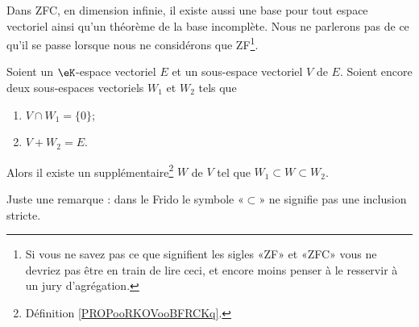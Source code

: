 Dans ZFC, en dimension infinie, il existe aussi une base pour tout espace vectoriel ainsi qu'un théorème de la base incomplète. Nous ne parlerons pas de ce qu'il se passe lorsque nous ne considérons que ZF\footnote{Si vous ne savez pas ce que signifient les sigles «ZF» et «ZFC» vous ne devriez pas être en train de lire ceci, et encore moins penser à le resservir à un jury d'agrégation.}.

\begin{lemma}        \label{LEMooSSRXooIyfgNz}
	Soient un \( \eK\)-espace vectoriel \( E\) et un sous-espace vectoriel \( V\) de \( E\). Soient encore deux sous-espaces vectoriels \( W_1\) et \( W_2\) tels que
	\begin{enumerate}
		\item
		      \( V\cap W_1=\{ 0 \}\);
		\item
		      \( V+W_2=E\).
	\end{enumerate}
	Alors il existe un supplémentaire\footnote{Définition \ref{PROPooRKOVooBFRCKq}.} \( W\) de \( V\) tel que \( W_1\subset W\subset W_2\).
\end{lemma}

Juste une remarque : dans le Frido le symbole «\( \subset\)» ne signifie pas une inclusion stricte.

